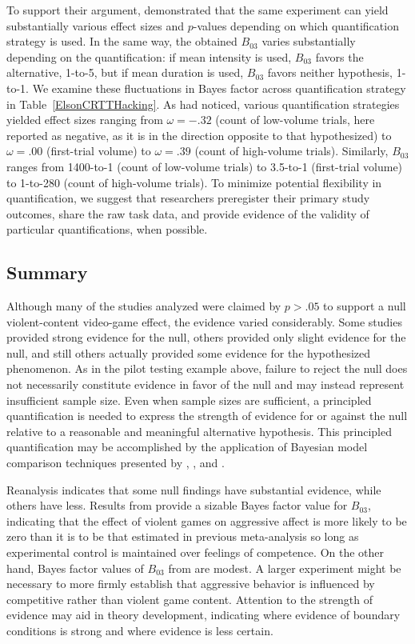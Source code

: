 \documentclass[man]{apa6}
\begin{document}
To support their argument, \citet{Elson:etal:2014} demonstrated that the same experiment can yield substantially various effect sizes and $p$-values depending on which quantification strategy is used. In the same way, the obtained $B_{03}$ varies substantially depending on the quantification: if mean intensity is used, $B_{03}$ favors the alternative, 1-to-5, but if mean duration is used, $B_{03}$ favors neither hypothesis, 1-to-1. We examine these fluctuations in Bayes factor across quantification strategy in Table~\ref{ElsonCRTTHacking}.  As \citet{Elson:etal:2014} had noticed, various quantification strategies yielded effect sizes ranging from $\omega = -.32$ (count of low-volume trials, here reported as negative, as it is in the direction opposite to that hypothesized) to $\omega = .00$ (first-trial volume) to $\omega = .39$ (count of high-volume trials). Similarly, $B_{03}$ ranges from 1400-to-1 (count of low-volume trials) to 3.5-to-1 (first-trial volume) to 1-to-280 (count of high-volume trials). To minimize potential flexibility in quantification, we suggest that researchers preregister their primary study outcomes, share the raw task data, and provide evidence of the validity of particular quantifications, when possible. 

\subsection{Summary}
Although many of the studies analyzed were claimed by $p>.05$ to support a null violent-content video-game effect, the evidence varied considerably.  Some studies provided strong evidence for the null, others provided only slight evidence for the null, and still others actually provided some evidence for the hypothesized phenomenon. As in the pilot testing example above, failure to reject the null does not necessarily constitute evidence in favor of the null and may instead represent insufficient sample size. Even when sample sizes are sufficient, a principled quantification is needed to express the strength of evidence for or against the null relative to a reasonable and meaningful alternative hypothesis. This principled quantification may be accomplished by the application of Bayesian model comparison techniques presented by \citet{Rouder:Morey:2012}, \citet{Rouder:etal:2012}, and \citet{Dienes:2011, Dienes:2014}. 

Reanalysis indicates that some null findings have substantial evidence, while others have less. Results from \citet{Przybylski:etal:2014} provide a sizable Bayes factor value for $B_{03}$, indicating that the effect of violent games on aggressive affect is more likely to be zero than it is to be that estimated in previous meta-analysis so long as experimental control is maintained over feelings of competence. On the other hand, Bayes factor values of $B_{03}$ from \citet{Adachi:Willoughby:2011} are modest.  A larger experiment might be necessary to more firmly establish that aggressive behavior is influenced by competitive rather than violent game content. Attention to the strength of evidence may aid in theory development, indicating where evidence of boundary conditions is strong and where evidence is less certain.
\end{document}
